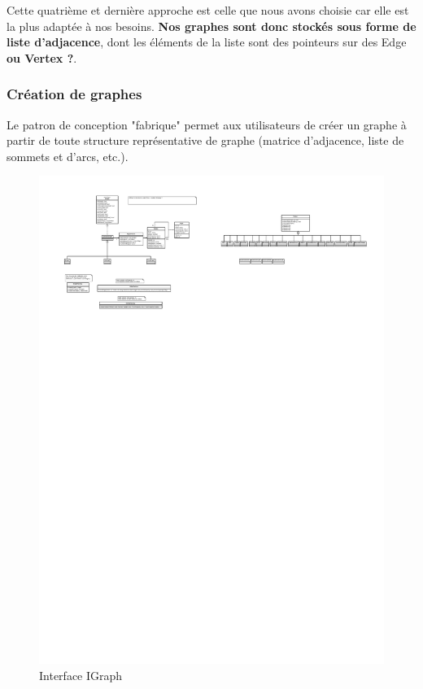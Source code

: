 \documentclass[french]{article}
\begin{document}
			Cette quatrième et dernière approche est celle que nous avons choisie car elle est la plus adaptée à nos besoins. \textbf{Nos graphes sont donc stockés sous forme de liste d'adjacence}, dont les éléments de la liste sont des pointeurs sur des Edge \textbf{\color{red}ou Vertex ?}.
			
			
			
			\subsubsection{Création de graphes}
			Le patron de conception "fabrique" permet aux utilisateurs de créer un graphe à partir de toute structure représentative de graphe (matrice d'adjacence, liste de sommets et d'arcs, etc.).
			\begin{figure}[H]
				\centering
				\includegraphics[scale=3.0]{Conception/igraph.pdf}
				\caption{Interface IGraph}
			\end{figure}
			
\end{document}
